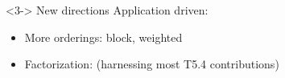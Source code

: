 {\begin{columns}
\begin{column}{.45\textwidth}
\end{column}
\end{columns}

\begin{block} <3-> {New directions}
  Application driven:
  \begin{itemize}
  \item More orderings: block, weighted
  \item Factorization: (harnessing most T5.4 contributions)
  \end{itemize}
  
\end{block}
}






